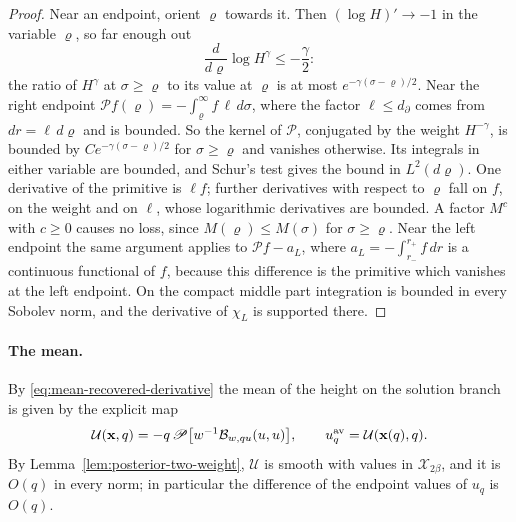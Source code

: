 \begin{proof}
Near an endpoint, orient $\varrho$ towards it. Then
$(\log H)'\to-1$ in the variable $\varrho$, so far enough out
\[
 \frac{d}{d\varrho}\log H^\gamma\le-\frac\gamma2 :
\]
the ratio of $H^\gamma$ at $\sigma\ge\varrho$ to its value at
$\varrho$ is at most $e^{-\gamma(\sigma-\varrho)/2}$. Near the right
endpoint $\mathscr Pf(\varrho)=-\int_\varrho^\infty f\,\ell\,d\sigma$,
where the factor $\ell\le d_\partial$ comes from $dr=\ell\,d\varrho$
and is bounded. So the kernel of $\mathscr P$, conjugated by the
weight $H^{-\gamma}$, is bounded by $Ce^{-\gamma(\sigma-\varrho)/2}$
for $\sigma\ge\varrho$ and vanishes otherwise. Its integrals in
either variable are bounded, and Schur's test gives the bound in
$L^2(d\varrho)$. One derivative of the primitive is $\ell f$; further
derivatives with respect to $\varrho$ fall on $f$, on the weight and
on $\ell$, whose logarithmic derivatives are bounded. A factor $M^c$
with $c\ge0$ causes no loss, since $M(\varrho)\le M(\sigma)$ for
$\sigma\ge\varrho$. Near the left endpoint the same
argument applies to $\mathscr Pf-a_L$, where
$a_L=-\int_{r_-}^{r_+}f\,dr$ is a continuous functional of $f$,
because this difference is the primitive which vanishes at the left
endpoint. On the compact middle part integration is bounded in every
Sobolev norm, and the derivative of $\chi_L$ is supported there.
\end{proof}

\paragraph{The mean.}
By \eqref{eq:mean-recovered-derivative} the mean of the height on the
solution branch is given by the explicit map
\begin{equation}\label{eq:rewrite-mean-recovery}
 \mathcal U(\mathbf x,q)
 =-q\,\mathscr P\bigl[w^{-1}\mathcal B_{w,qu}(u,u)\bigr],
 \qquad u_q^{\rm av}=\mathcal U(\mathbf x(q),q) .
\end{equation}
By Lemma~\ref{lem:posterior-two-weight}, $\mathcal U$ is smooth with
values in $\mathcal X_{2\beta}$, and it is $O(q)$ in every norm; in
particular the difference of the endpoint values of $u_q$ is $O(q)$.

